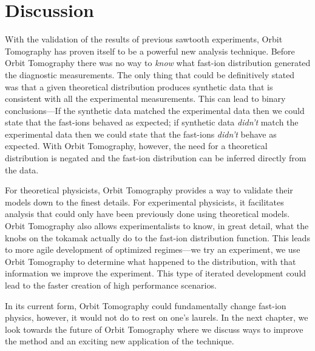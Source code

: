 \section{Discussion}
With the validation of the results of previous sawtooth experiments, Orbit Tomography has proven itself to be a powerful new analysis technique.
Before Orbit Tomography there was no way to \textit{know} what fast-ion distribution generated the diagnostic measurements.
The only thing that could be definitively stated was that a given theoretical distribution produces synthetic data that is consistent with all the experimental measurements.
This can lead to binary conclusions---If the synthetic data matched the experimental data then we could state that the fast-ions behaved as expected; if synthetic data \textit{didn't} match the experimental data then we could state that the fast-ions \textit{didn't} behave as expected.
With Orbit Tomography, however, the need for a theoretical distribution is negated and the fast-ion distribution can be inferred directly from the data.

For theoretical physicists, Orbit Tomography provides a way to validate their models down to the finest details.
For experimental physicists, it facilitates analysis that could only have been previously done using theoretical models.
Orbit Tomography also allows experimentalists to know, in great detail, what the knobs on the tokamak actually do to the fast-ion distribution function.
This leads to more agile development of optimized regimes---we try an experiment, we use Orbit Tomography to determine what happened to the distribution, with that information we improve the experiment. This type of iterated development could lead to the faster creation of high performance scenarios. 

In its current form, Orbit Tomography could fundamentally change fast-ion physics, however, it would not do to rest on one's laurels. In the next chapter, we look towards the future of Orbit Tomography where we discuss ways to improve the method and an exciting new application of the technique.